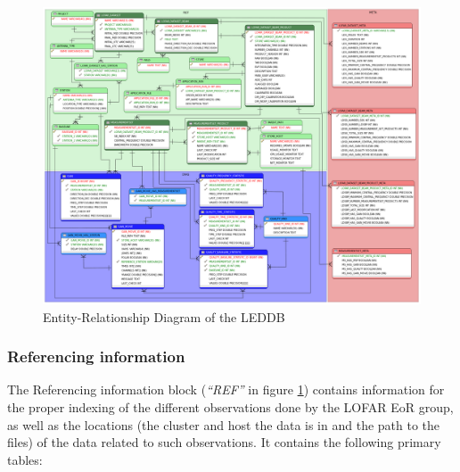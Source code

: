 \documentclass[a4paper,11pt]{article}
\begin{document}
\begin{figure}[h]
	\centering
	\includegraphics[scale=0.25]{fig/leddber} 
	\caption{Entity-Relationship Diagram of the LEDDB}
	\label{fig:leddber}
\end{figure}

\subsubsection{Referencing information}
\label{sec:ref}

The Referencing information block (\textit{``REF''} in figure \ref{fig:leddber}) contains information for the proper indexing of the different observations done by the LOFAR EoR group, as well as the locations (the cluster and host the data is in and the path to the files) of the data related to such observations. It contains the following primary tables:
\end{document}
